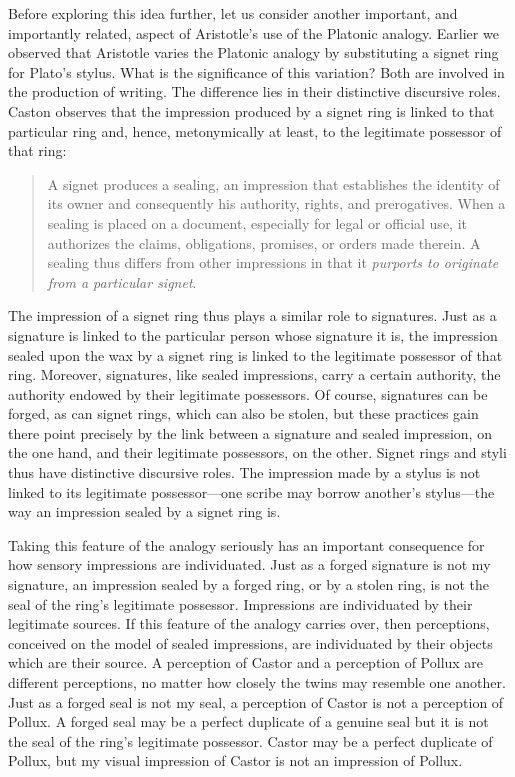 Before exploring this idea further, let us consider another important, and importantly related, aspect of Aristotle's use of the Platonic analogy. Earlier we observed that Aristotle varies the Platonic analogy by substituting a signet ring for Plato's stylus. What is the significance of this variation? Both are involved in the production of writing. The difference lies in their distinctive discursive roles. Caston observes that the impression produced by a signet ring is linked to that particular ring and, hence, metonymically at least, to the legitimate possessor of that ring:
\begin{quote}
	A signet produces a sealing, an impression that establishes the identity of its owner and consequently his authority, rights, and prerogatives. When a sealing is placed on a document, especially for legal or official use, it authorizes the claims, obligations, promises, or orders made therein. A sealing thus differs from other impressions in that it \emph{purports to originate from a particular signet}. \citep[302]{Caston:2005cr}
\end{quote}
The impression of a signet ring thus plays a similar role to signatures. Just as a signature is linked to the particular person whose signature it is, the impression sealed upon the wax by a signet ring is linked to the legitimate possessor of that ring. Moreover, signatures, like sealed impressions, carry a certain authority, the authority endowed by their legitimate possessors. Of course, signatures can be forged, as can signet rings, which can also be stolen, but these practices gain there point precisely by the link between a signature and sealed impression, on the one hand, and their legitimate possessors, on the other. Signet rings and styli thus have distinctive discursive roles. The impression made by a stylus is not linked to its legitimate possessor---one scribe may borrow another's stylus---the way an impression sealed by a signet ring is.

Taking this feature of the analogy seriously has an important consequence for how sensory impressions are individuated. Just as a forged signature is not my signature, an impression sealed by a forged ring, or by a stolen ring, is not the seal of the ring's legitimate possessor. Impressions are individuated by their legitimate sources. If this feature of the analogy carries over, then perceptions, conceived on the model of sealed impressions, are individuated by their objects which are their source. A perception of Castor and a perception of Pollux are different perceptions, no matter how closely the twins may resemble one another. Just as a forged seal is not my seal, a perception of Castor is not a perception of Pollux. A forged seal may be a perfect duplicate of a genuine seal but it is not the seal of the ring's legitimate possessor. Castor may be a perfect duplicate of Pollux, but my visual impression of Castor is not an impression of Pollux. 

